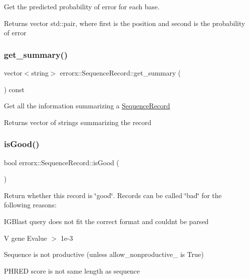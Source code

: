 Get the predicted probability of error for each base.

\begin{DoxyReturn}{Returns}
vector std\+::pair, where first is the position and second is the probability of error 
\end{DoxyReturn}
\mbox{\label{classerrorx_1_1_sequence_record_ada8bdfb462b2ba29808b258f4380dbf0}} 
\subsubsection{\texorpdfstring{get\+\_\+summary()}{get\_summary()}}
{\footnotesize\ttfamily vector$<$string$>$ errorx\+::\+Sequence\+Record\+::get\+\_\+summary (\begin{DoxyParamCaption}{ }\end{DoxyParamCaption}) const}

Get all the information summarizing a \mbox{\hyperlink{classerrorx_1_1_sequence_record}{Sequence\+Record}}

\begin{DoxyReturn}{Returns}
vector of strings summarizing the record 
\end{DoxyReturn}
\mbox{\label{classerrorx_1_1_sequence_record_adcc3a75cb5d42ffef94c1c9552fb7c9e}} 
\subsubsection{\texorpdfstring{is\+Good()}{isGood()}}
{\footnotesize\ttfamily bool errorx\+::\+Sequence\+Record\+::is\+Good (\begin{DoxyParamCaption}{ }\end{DoxyParamCaption})}

Return whether this record is \char`\"{}good\char`\"{}. Records can be called \char`\"{}bad\char`\"{} for the following reasons\+:
\begin{DoxyEnumerate}
\item I\+G\+Blast query does not fit the correct format and couldn\textquotesingle{}t be parsed
\item V gene Evalue $>$ 1e-\/3
\item Sequence is not productive (unless allow\+\_\+nonproductive\+\_\+ is True)
\item P\+H\+R\+ED score is not same length as sequence
\end{DoxyEnumerate}

